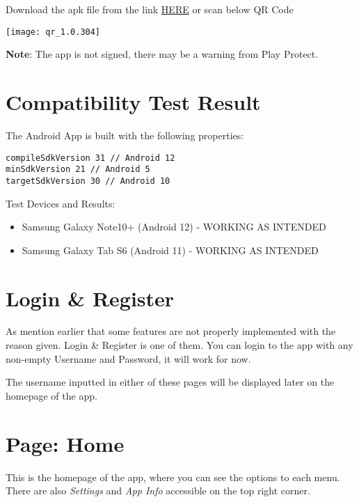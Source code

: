 \documentclass[a4paper,12pt]{article}
\begin{document}
\noindent
\begin{simplechar}
    Download the apk file from the link \href{https://github.com/Food-Busters/food_busters/releases/download/1.0.304/food_busters-1.0.304.apk}{HERE} or scan below QR Code
\end{simplechar}

\centerline{\texttt{[image: qr\_1.0.304]}}

\noindent
\textbf{Note}: The app is not signed, there may be a warning from Play Protect.

\section*{Compatibility Test Result}

\noindent
The Android App is built with the following properties:
\begin{lstlisting}
compileSdkVersion 31 // Android 12
minSdkVersion 21 // Android 5
targetSdkVersion 30 // Android 10
\end{lstlisting}

\noindent
Test Devices and Results:
\begin{itemize}
    \item Samsung Galaxy Note10+ (Android 12) - WORKING AS INTENDED
    \item Samsung Galaxy Tab S6 (Android 11) - WORKING AS INTENDED
\end{itemize}

\section{Login \& Register}


As mention earlier that some features are not properly implemented with the reason given.
Login \& Register is one of them. You can login to the app with any non-empty Username and
Password, it will work for now.

The username inputted in either of these pages will be displayed later on
the homepage of the app.

\pagebreak
\section{Page: Home}


This is the homepage of the app, where you can see the options to each menu.
There are also \textit{Settings} and \textit{App Info} accessible on the top right corner.
\end{document}
